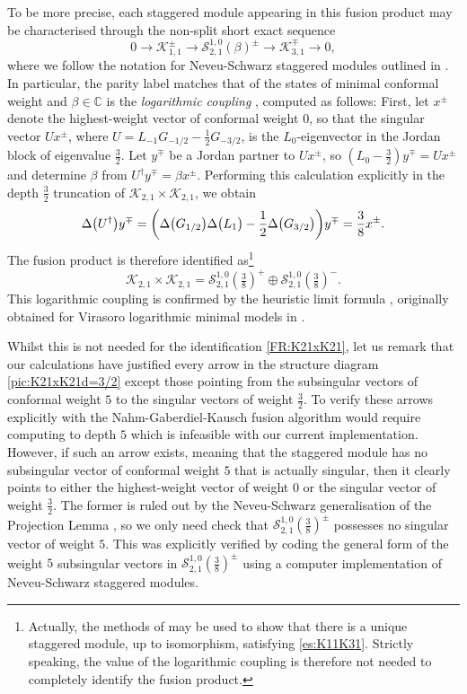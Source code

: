 \documentclass[a4paper,reqno,12pt]{report}
\theoremstyle{definition}
\numberwithin{equation}{section}
\let\originalleft\left     %
\let\originalright\right
\renewcommand{\left}{\mathopen{}\mathclose\bgroup\originalleft}
\renewcommand{\right}{\aftergroup\egroup\originalright}
\newcommand{\brac}[1]{\left( #1 \right)}
\newcommand{\CC}{\mathbb{C}}
\newcommand{\lra}{\longrightarrow}
\newcommand{\Kac}[1]{\mathcal{K}_{#1}}       %
\newcommand{\Stag}[2]{\mathcal{S}_{#1}^{#2}} %
\newcommand{\fuse}{\mathbin{\times}}                                            %
\newcommand{\coproductsymb}{\Delta}                                                %
\newcommand{\coproduct}[1]{\coproductsymb \bigl( #1 \bigr)}                        %
\newcommand{\dses}[5]{0 \lra #1 \overset{#2}{\lra} #3 \overset{#4}{\lra} #5 \lra 0} %
\newcommand{\hw}{highest-weight}
\newcommand{\sv}{singular vector}
\newcommand{\svs}{singular vectors}
\newcommand{\ssv}{subsingular vector}
\newcommand{\ssvs}{subsingular vectors}
\newcommand{\NGK}{Nahm-Gaberdiel-Kausch}
\newcommand{\ns}{Neveu-Schwarz}
\theoremstyle{plain}
\newcommand{\hwv}{\hw{} vector}
\begin{document}
To be more precise, each staggered module appearing in this fusion product may be characterised through the non-split short exact sequence
\begin{equation} \label{es:K11K31}
\dses{\Kac{1,1}^{\pm}}{}{\Stag{2,1}{1,0}(\beta)^{\pm}}{}{\Kac{3,1}^{\mp}},
\end{equation}
where we follow the notation for \ns{} staggered modules outlined in \cite[App.~B]{CanFusI15}.  In particular, the parity label matches that of the states of minimal conformal weight and $\beta \in \CC$ is the \emph{logarithmic coupling} \cite{RidPer07}, computed as follows:  First, let $x^{\pm}$ denote the \hwv{} of conformal weight $0$, so that the \sv{} $U x^{\pm}$, where $U = L_{-1} G_{-1/2} - \frac{1}{2} G_{-3/2}$, is the $L_0$-eigenvector in the Jordan block of eigenvalue $\frac{3}{2}$.  Let $y^{\mp}$ be a Jordan partner to $U x^{\pm}$, so $(L_0 - \frac{3}{2}) y^{\mp} = U x^{\pm}$ and determine $\beta$ from $U^{\dag} y^{\mp} = \beta x^{\pm}$.  Performing this calculation explicitly in the depth $\frac{3}{2}$ truncation of $\Kac{2,1} \fuse \Kac{2,1}$, we obtain
\begin{equation}
\coproduct{U^{\dag}} y^{\mp} = \brac{\coproduct{G_{1/2}} \coproduct{L_1} - \frac{1}{2} \coproduct{G_{3/2}}} y^{\mp} = \frac{3}{8} x^{\pm}.
\end{equation}
The fusion product is therefore identified as\footnote{Actually, the methods of \cite{RidLog07} may be used to show that there is a unique staggered module, up to isomorphism, satisfying \eqref{es:K11K31}.  Strictly speaking, the value of the logarithmic coupling is therefore not needed to completely identify the fusion product.}
\begin{equation} \label{FR:K21xK21}
\Kac{2,1} \fuse \Kac{2,1} = \Stag{2,1}{1,0}(\tfrac{3}{8})^+ \oplus \Stag{2,1}{1,0}(\tfrac{3}{8})^-.
\end{equation}
This logarithmic coupling is confirmed by the heuristic limit formula \cite[Eq.~(B.5)]{CanFusI15}, originally obtained for Virasoro logarithmic minimal models in \cite{VasInd11,GaiLat13}.

Whilst this is not needed for the identification \eqref{FR:K21xK21}, let us remark that our calculations have justified every arrow in the structure diagram \eqref{pic:K21xK21d=3/2} except those pointing from the \ssvs{} of conformal weight $5$ to the \svs{} of weight $\frac{3}{2}$.  To verify these arrows explicitly with the \NGK{} fusion algorithm would require computing to depth $5$ which is infeasible with our current implementation.  However, if such an arrow exists, meaning that the staggered module has no \ssv{} of conformal weight $5$ that is actually singular, then it clearly points to either the \hwv{} of weight $0$ or the \sv{} of weight $\frac{3}{2}$.  The former is ruled out by the \ns{} generalisation of the Projection Lemma \cite[Lem.~5.1]{RidSta09}, so we only need check that $\Stag{2,1}{1,0}(\frac{3}{8})^{\pm}$ possesses no \sv{} of weight $5$.  This was explicitly verified by coding the general form of the weight $5$ \ssvs{} in $\Stag{2,1}{1,0}(\frac{3}{8})^{\pm}$ using a computer implementation of \ns{} staggered modules.
\end{document}
